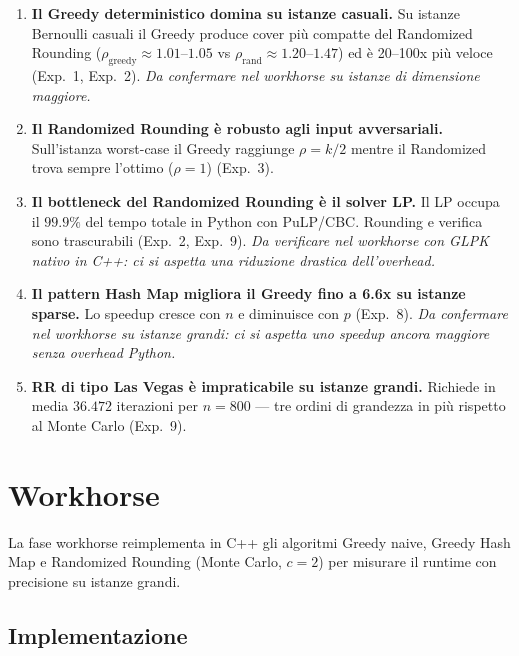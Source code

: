 \documentclass[12pt, a4paper]{article}
\begin{document}
\begin{enumerate}

    \item \textbf{Il Greedy deterministico domina su istanze casuali.}
    Su istanze Bernoulli casuali il Greedy produce cover pi\`u compatte 
    del Randomized Rounding ($\rho_{\text{greedy}} \approx 1.01$--$1.05$ 
    vs $\rho_{\text{rand}} \approx 1.20$--$1.47$) ed \`e 20--100x 
    pi\`u veloce (Exp.~1, Exp.~2).
    \textit{Da confermare nel workhorse su istanze di dimensione maggiore.}

    \item \textbf{Il Randomized Rounding \`e robusto agli input avversariali.}
    Sull'istanza worst-case il Greedy raggiunge $\rho = k/2$ mentre 
    il Randomized trova sempre l'ottimo ($\rho = 1$) (Exp.~3).

    \item \textbf{Il bottleneck del Randomized Rounding \`e il solver LP.}
    Il LP occupa il $99.9\%$ del tempo totale in Python con PuLP/CBC. 
    Rounding e verifica sono trascurabili (Exp.~2, Exp.~9).
    \textit{Da verificare nel workhorse con GLPK nativo in C++: 
    ci si aspetta una riduzione drastica dell'overhead.}

    \item \textbf{Il pattern Hash Map migliora il Greedy fino a 6.6x 
    su istanze sparse.}
    Lo speedup cresce con $n$ e diminuisce con $p$ (Exp.~8).
    \textit{Da confermare nel workhorse su istanze grandi: 
    ci si aspetta uno speedup ancora maggiore senza overhead Python.}

    \item \textbf{RR di tipo Las Vegas \`e impraticabile su istanze grandi.}
    Richiede in media $36.472$ iterazioni per $n=800$ — 
    tre ordini di grandezza in pi\`u rispetto al Monte Carlo (Exp.~9).

\end{enumerate}

\section{Workhorse}
\label{sec:workhorse}

La fase workhorse reimplementa in C++ gli algoritmi Greedy naive, 
Greedy Hash Map e Randomized Rounding (Monte Carlo, $c=2$) 
per misurare il runtime con precisione su istanze grandi.

\subsection{Implementazione}
\end{document}
